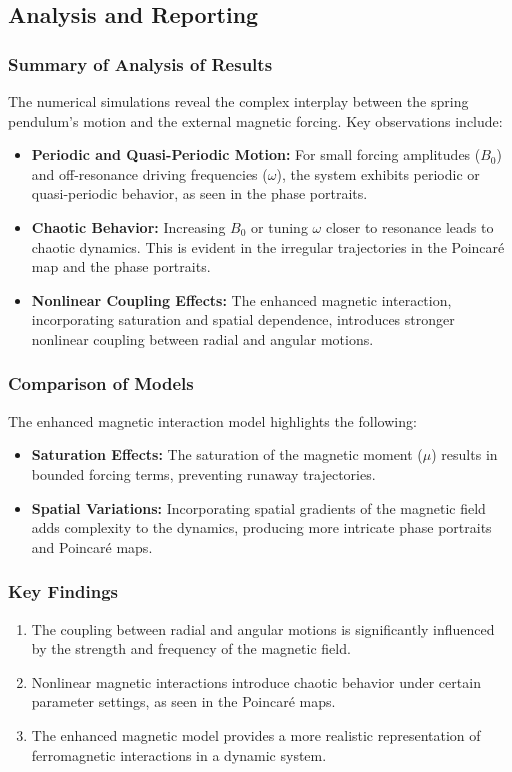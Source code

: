 \documentclass[12pt]{article}
\begin{document}
\subsection{Analysis and Reporting}

\subsubsection{Summary of Analysis of Results}
The numerical simulations reveal the complex interplay between the spring pendulum's motion and the external magnetic forcing. Key observations include:
\begin{itemize}
    \item \textbf{Periodic and Quasi-Periodic Motion:} For small forcing amplitudes (\( B_0 \)) and off-resonance driving frequencies (\( \omega \)), the system exhibits periodic or quasi-periodic behavior, as seen in the phase portraits.
    \item \textbf{Chaotic Behavior:} Increasing \( B_0 \) or tuning \( \omega \) closer to resonance leads to chaotic dynamics. This is evident in the irregular trajectories in the Poincaré map and the phase portraits.
    \item \textbf{Nonlinear Coupling Effects:} The enhanced magnetic interaction, incorporating saturation and spatial dependence, introduces stronger nonlinear coupling between radial and angular motions.
\end{itemize}

\subsubsection{Comparison of Models}
The enhanced magnetic interaction model highlights the following:
\begin{itemize}
    \item \textbf{Saturation Effects:} The saturation of the magnetic moment (\( \mu \)) results in bounded forcing terms, preventing runaway trajectories.
    \item \textbf{Spatial Variations:} Incorporating spatial gradients of the magnetic field adds complexity to the dynamics, producing more intricate phase portraits and Poincaré maps.
\end{itemize}

\subsubsection{Key Findings}
\begin{enumerate}
    \item The coupling between radial and angular motions is significantly influenced by the strength and frequency of the magnetic field.
    \item Nonlinear magnetic interactions introduce chaotic behavior under certain parameter settings, as seen in the Poincaré maps.
    \item The enhanced magnetic model provides a more realistic representation of ferromagnetic interactions in a dynamic system.
\end{enumerate}
\end{document}
